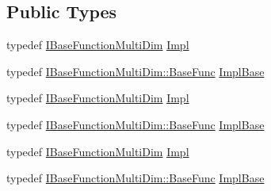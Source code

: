 \subsection*{Public Types}
\begin{DoxyCompactItemize}
\item 
typedef \mbox{\hyperlink{classROOT_1_1Math_1_1IBaseFunctionMultiDim}{I\+Base\+Function\+Multi\+Dim}} \mbox{\hyperlink{classROOT_1_1Math_1_1Functor_aef374d72e63fb0fea13a8cc3d4f2091b}{Impl}}
\item 
typedef \mbox{\hyperlink{classROOT_1_1Math_1_1IBaseFunctionMultiDim_a44c87c3e8c23d140cc3bf067d6480070}{I\+Base\+Function\+Multi\+Dim\+::\+Base\+Func}} \mbox{\hyperlink{classROOT_1_1Math_1_1Functor_acc5dacb213f26296122e95138f5153b3}{Impl\+Base}}
\item 
typedef \mbox{\hyperlink{classROOT_1_1Math_1_1IBaseFunctionMultiDim}{I\+Base\+Function\+Multi\+Dim}} \mbox{\hyperlink{classROOT_1_1Math_1_1Functor_aef374d72e63fb0fea13a8cc3d4f2091b}{Impl}}
\item 
typedef \mbox{\hyperlink{classROOT_1_1Math_1_1IBaseFunctionMultiDim_a44c87c3e8c23d140cc3bf067d6480070}{I\+Base\+Function\+Multi\+Dim\+::\+Base\+Func}} \mbox{\hyperlink{classROOT_1_1Math_1_1Functor_acc5dacb213f26296122e95138f5153b3}{Impl\+Base}}
\item 
typedef \mbox{\hyperlink{classROOT_1_1Math_1_1IBaseFunctionMultiDim}{I\+Base\+Function\+Multi\+Dim}} \mbox{\hyperlink{classROOT_1_1Math_1_1Functor_aef374d72e63fb0fea13a8cc3d4f2091b}{Impl}}
\item 
typedef \mbox{\hyperlink{classROOT_1_1Math_1_1IBaseFunctionMultiDim_a44c87c3e8c23d140cc3bf067d6480070}{I\+Base\+Function\+Multi\+Dim\+::\+Base\+Func}} \mbox{\hyperlink{classROOT_1_1Math_1_1Functor_acc5dacb213f26296122e95138f5153b3}{Impl\+Base}}
\end{DoxyCompactItemize}
